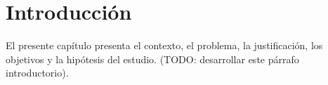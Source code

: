 
\chapter{Introducción}

\label{cap:introduccion}

El presente capítulo presenta el contexto, el problema, la justificación,
los objetivos y la hipótesis del estudio. (TODO: desarrollar este
párrafo introductorio).

 
 

